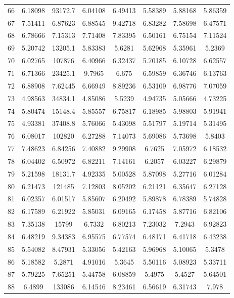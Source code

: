 \begin{center}
\begin{longtable}{cccccccc}
66 & 6.18098 & 93172.7 & 6.04108 & 6.49413 & 5.58389 & 5.88168 & 5.86359\\
67 & 7.51411 & 6.87623 & 6.88545 & 9.42718 & 6.83282 & 7.58698 & 6.47571\\
68 & 6.78666 & 7.15313 & 7.71408 & 7.83395 & 6.50161 & 6.75154 & 7.11524\\
69 & 5.20742 & 13205.1 & 5.83383 & 5.6281 & 5.62968 & 5.35961 & 5.2369\\
70 & 6.02765 & 107876 & 6.40966 & 6.32437 & 5.70185 & 6.10728 & 6.62557\\
71 & 6.71366 & 23425.1 & 9.7965 & 6.675 & 6.59859 & 6.36746 & 6.13763\\
72 & 6.88908 & 7.62445 & 6.66949 & 8.89236 & 6.53109 & 6.98776 & 7.07059\\
73 & 4.98563 & 34834.1 & 4.85086 & 5.5239 & 4.94735 & 5.05666 & 4.73225\\
74 & 5.80474 & 15148.4 & 5.85557 & 6.75817 & 6.18985 & 5.98803 & 5.91941\\
75 & 4.93381 & 37408.8 & 5.76066 & 5.43098 & 5.51797 & 5.19714 & 5.31495\\
76 & 6.08017 & 102820 & 6.27288 & 7.14073 & 5.69086 & 5.73698 & 5.8403\\
77 & 7.48623 & 6.84256 & 7.40882 & 9.29908 & 6.7625 & 7.05972 & 6.18532\\
78 & 6.04402 & 6.50972 & 6.82211 & 7.14161 & 6.2057 & 6.03227 & 6.29879\\
79 & 5.21598 & 18131.7 & 4.92335 & 5.00528 & 5.87098 & 5.27716 & 6.01284\\
80 & 6.21473 & 121485 & 7.12803 & 8.05202 & 6.21121 & 6.35647 & 6.27128\\
81 & 6.02357 & 6.01517 & 5.85607 & 6.20492 & 5.89878 & 6.78389 & 5.74828\\
82 & 6.17589 & 6.21922 & 5.85031 & 6.09165 & 6.17458 & 5.87716 & 6.82106\\
83 & 7.35138 & 15799 & 6.7332 & 6.80213 & 7.23032 & 7.2943 & 6.92823\\
84 & 6.48219 & 9.34383 & 6.95575 & 6.77574 & 6.48171 & 6.41718 & 6.43238\\
85 & 5.54082 & 8.47931 & 5.33056 & 5.42163 & 5.96968 & 5.10065 & 5.3478\\
86 & 5.18582 & 5.2871 & 4.91016 & 5.3645 & 5.50116 & 5.08923 & 5.33711\\
87 & 5.79225 & 7.65251 & 5.44758 & 6.08859 & 5.4975 & 5.4527 & 5.64501\\
88 & 6.4899 & 133086 & 6.14546 & 8.23461 & 6.56619 & 6.31743 & 7.978\\

\end{longtable}
\end{center}
